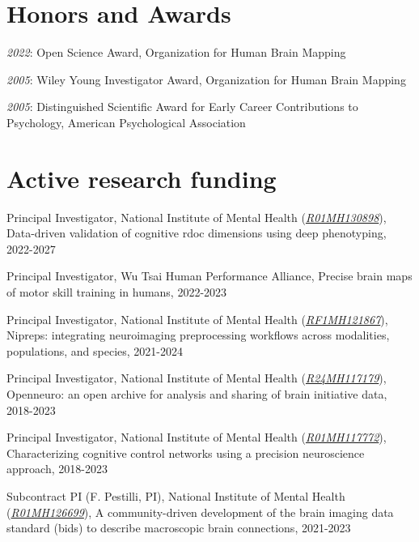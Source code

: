 \documentclass[10pt, letterpaper]{article}
\begin{document}
\section*{Honors and Awards}
\noindent
\textit{2022}: Open Science Award, Organization for Human Brain Mapping

\textit{2005}: Wiley Young Investigator Award, Organization for Human Brain Mapping

\textit{2005}: Distinguished Scientific Award for Early Career Contributions to Psychology, American Psychological Association


\section*{Active research funding}
\noindent

Principal Investigator, National Institute of Mental Health (\href{https://reporter.nih.gov/project-details/10515980}{\textit{R01MH130898}}), Data-driven validation of cognitive rdoc dimensions using deep phenotyping, 2022-2027\vspace{2mm}

Principal Investigator, Wu Tsai Human Performance Alliance, Precise brain maps of motor skill training in humans, 2022-2023\vspace{2mm}

Principal Investigator, National Institute of Mental Health (\href{https://reporter.nih.gov/project-details/10260312}{\textit{RF1MH121867}}), Nipreps: integrating neuroimaging preprocessing workflows across modalities, populations, and species, 2021-2024\vspace{2mm}

Principal Investigator, National Institute of Mental Health (\href{http://projectreporter.nih.gov/project_info_description.cfm?aid=9770947}{\textit{R24MH117179}}), Openneuro: an open archive for analysis and sharing of brain initiative data, 2018-2023\vspace{2mm}

Principal Investigator, National Institute of Mental Health (\href{http://projectreporter.nih.gov/project_info_description.cfm?aid=9906911}{\textit{R01MH117772}}), Characterizing cognitive control networks using a precision neuroscience approach, 2018-2023\vspace{2mm}

Subcontract PI (F. Pestilli, PI), National Institute of Mental Health (\href{https://reporter.nih.gov/project-details/10253558}{\textit{R01MH126699}}), A community-driven development of the brain imaging data standard (bids) to describe macroscopic brain connections, 2021-2023\vspace{2mm}
\end{document}
